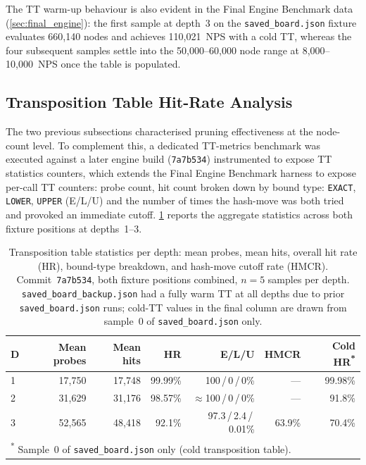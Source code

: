The TT warm-up behaviour is also evident in the Final Engine Benchmark data
(\cref{sec:final_engine}): the first sample at depth~3 on the
\texttt{saved\_board.json} fixture evaluates 660{,}140 nodes and achieves 110{,}021~NPS
with a cold TT, whereas the four subsequent samples settle into the 50{,}000--60{,}000
node range at 8{,}000--10{,}000~NPS once the table is populated.

\subsection{Transposition Table Hit-Rate Analysis}
\label{sec:tt_hitrate}

The two previous subsections characterised pruning effectiveness at the node-count level.
To complement this, a dedicated TT-metrics benchmark was executed against a later engine build (\texttt{7a7b534}) instrumented to expose TT statistics counters, which extends the Final Engine Benchmark harness to expose per-call
TT counters: probe count, hit count broken down by bound type: \texttt{EXACT},
\texttt{LOWER}, \texttt{UPPER} (E/L/U) and the number of times the hash-move was both tried and
provoked an immediate cutoff. \cref{tab:tt_stats} reports the aggregate statistics
across both fixture positions at depths~1--3.

\begin{table}[ht]
  \centering
  \caption{Transposition table statistics per depth: mean probes, mean hits, overall hit
    rate (HR), bound-type breakdown, and hash-move cutoff rate (HMCR). Commit~\texttt{7a7b534},
    both fixture positions combined, $n = 5$ samples per depth.
    \texttt{saved\_board\_backup.json} had a fully warm TT at all depths due to prior
    \texttt{saved\_board.json} runs; cold-TT values in the final column are drawn from
    sample~0 of \texttt{saved\_board.json} only.}
  \label{tab:tt_stats}
  \begin{tabular}{lrrrrrr}
    \hline
    \textbf{D}
      & \textbf{Mean probes}
      & \textbf{Mean hits}
      & \textbf{HR}
      & \textbf{E/L/U}
      & \textbf{HMCR}
      & \textbf{Cold HR\textsuperscript{*}}                                                                        \\
    \hline
    1 & 17{,}750                            & 17{,}748 & 99.99\% & 100\,/\,0\,/\,0\%            & ---    & 99.98\% \\
    2 & 31{,}629                            & 31{,}176 & 98.57\% & ${\approx}$100\,/\,0\,/\,0\% & ---    & 91.8\%  \\
    3 & 52{,}565                            & 48{,}418 & 92.1\%  & 97.3\,/\,2.4\,/\,0.01\%      & 63.9\% & 70.4\%  \\
    \hline
    \multicolumn{7}{l}{\textsuperscript{*} Sample~0 of \texttt{saved\_board.json} only
      (cold transposition table).}
  \end{tabular}
\end{table}

